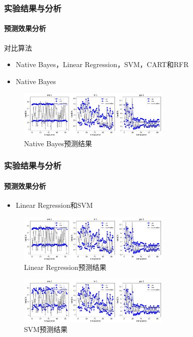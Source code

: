 \begin{frame}
\frametitle{实验结果与分析}
\framesubtitle{预测效果分析}
\begin{block}{对比算法}
    \begin{itemize}
        \item Native Bayes，Linear Regression，SVM，CART和RFR
    \end{itemize}
\end{block}
\begin{itemize}
    \item Native Bayes
\end{itemize}
\begin{minipage}{\textwidth}
    \centering
    \begin{figure}[htb]
    \centering
    \includegraphics[width=0.65\textwidth]{figures/fig12_a_bayesian.png}
    \caption{Native Bayes预测结果}
    \label{fig:fig12_a}
    \end{figure}
\end{minipage}
\end{frame}

\begin{frame}
\frametitle{实验结果与分析}
\framesubtitle{预测效果分析}
\begin{itemize}
    \item Linear Regression和SVM
\end{itemize}
\begin{minipage}{\textwidth}
    \centering
    \begin{figure}[htb]
    \centering
    \includegraphics[width=0.65\textwidth]{figures/fig12_b_linear.png}
    \caption{Linear Regression预测结果}
    \label{fig:fig12_b}
    \end{figure}
\end{minipage}
\begin{minipage}{\textwidth}
    \centering
    \begin{figure}[htb]
    \centering
    \includegraphics[width=0.65\textwidth]{figures/fig12_c_svm.png}
    \caption{SVM预测结果}
    \label{fig:fig12_c}
    \end{figure}
\end{minipage}
\end{frame}


